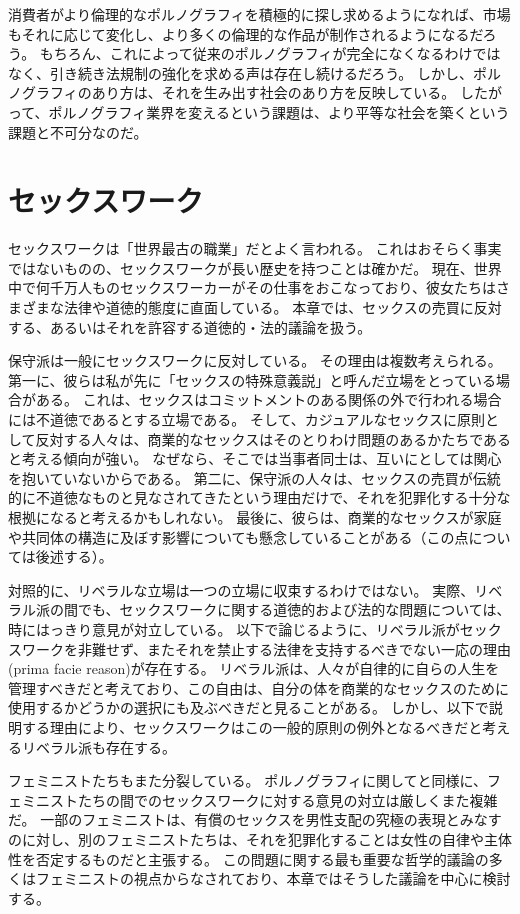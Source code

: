 \documentclass[paper=a4,book,openany]{jlreq} \usepackage{mystyle}
\begin{document}
消費者がより倫理的なポルノグラフィを積極的に探し求めるようになれば、市場もそれに応じて変化し、より多くの倫理的な作品が制作されるようになるだろう。
もちろん、これによって従来のポルノグラフィが完全になくなるわけではなく、引き続き法規制の強化を求める声は存在し続けるだろう。
しかし、ポルノグラフィのあり方は、それを生み出す社会のあり方を反映している。
したがって、ポルノグラフィ業界を変えるという課題は、より平等な社会を築くという課題と不可分なのだ。

\section{セックスワーク}

セックスワークは「世界最古の職業」だとよく言われる。
これはおそらく事実ではないものの、セックスワークが長い歴史を持つことは確かだ。
現在、世界中で何千万人ものセックスワーカーがその仕事をおこなっており、彼女たちはさまざまな法律や道徳的態度に直面している。
本章では、セックスの売買に反対する、あるいはそれを許容する道徳的・法的議論を扱う。

保守派は一般にセックスワークに反対している。
その理由は複数考えられる。
第一に、彼らは私が先に「セックスの特殊意義説」と呼んだ立場をとっている場合がある。
これは、セックスはコミットメントのある関係の外で行われる場合には不道徳であるとする立場である。
そして、カジュアルなセックスに原則として反対する人々は、商業的なセックスはそのとりわけ問題のあるかたちであると考える傾向が強い。
なぜなら、そこでは当事者同士は、互いにとしては関心を抱いていないからである。
第二に、保守派の人々は、セックスの売買が伝統的に不道徳なものと見なされてきたという理由だけで、それを犯罪化する十分な根拠になると考えるかもしれない。
最後に、彼らは、商業的なセックスが家庭や共同体の構造に及ぼす影響についても懸念していることがある（この点については後述する）。

対照的に、リベラルな立場は一つの立場に収束するわけではない。
実際、リベラル派の間でも、セックスワークに関する道徳的および法的な問題については、時にはっきり意見が対立している。
以下で論じるように、リベラル派がセックスワークを非難せず、またそれを禁止する法律を支持するべきでない一応の理由(prima facie reason)が存在する。
リベラル派は、人々が自律的に自らの人生を管理すべきだと考えており、この自由は、自分の体を商業的なセックスのために使用するかどうかの選択にも及ぶべきだと見ることがある。
しかし、以下で説明する理由により、セックスワークはこの一般的原則の例外となるべきだと考えるリベラル派も存在する。

フェミニストたちもまた分裂している。
ポルノグラフィに関してと同様に、フェミニストたちの間でのセックスワークに対する意見の対立は厳しくまた複雑だ。
一部のフェミニストは、有償のセックスを男性支配の究極の表現とみなすのに対し、別のフェミニストたちは、それを犯罪化することは女性の自律や主体性を否定するものだと主張する。
この問題に関する最も重要な哲学的議論の多くはフェミニストの視点からなされており、本章ではそうした議論を中心に検討する。
\end{document}
